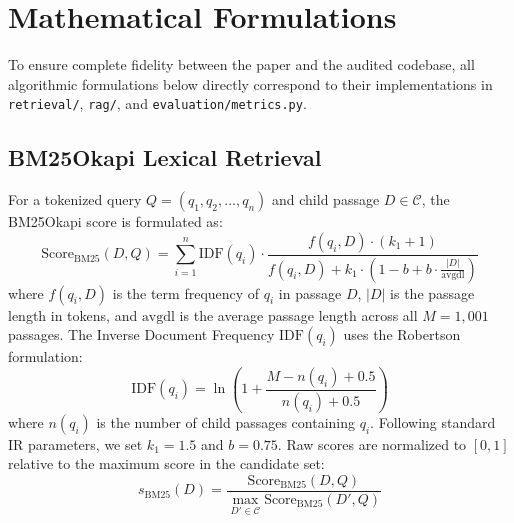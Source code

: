 \documentclass[10pt,twocolumn]{article}
\begin{document}
\section{Mathematical Formulations}
\label{sec:math_formulations}

To ensure complete fidelity between the paper and the audited codebase, all algorithmic formulations below directly correspond to their implementations in \texttt{retrieval/}, \texttt{rag/}, and \texttt{evaluation/metrics.py}.

\subsection{BM25Okapi Lexical Retrieval}
For a tokenized query $Q = (q_1, q_2, \dots, q_n)$ and child passage $D \in \mathcal{C}$, the BM25Okapi score is formulated as:
\begin{equation}
\text{Score}_{\text{BM25}}(D, Q) = \sum_{i=1}^n \text{IDF}(q_i) \cdot \frac{f(q_i, D) \cdot (k_1 + 1)}{f(q_i, D) + k_1 \cdot \left(1 - b + b \cdot \frac{|D|}{\text{avgdl}}\right)}
\label{eq:bm25}
\end{equation}
where $f(q_i, D)$ is the term frequency of $q_i$ in passage $D$, $|D|$ is the passage length in tokens, and $\text{avgdl}$ is the average passage length across all $M = 1,001$ passages. The Inverse Document Frequency $\text{IDF}(q_i)$ uses the Robertson formulation:
\begin{equation}
\text{IDF}(q_i) = \ln \left(1 + \frac{M - n(q_i) + 0.5}{n(q_i) + 0.5}\right)
\label{eq:idf}
\end{equation}
where $n(q_i)$ is the number of child passages containing $q_i$. Following standard IR parameters, we set $k_1 = 1.5$ and $b = 0.75$. Raw scores are normalized to $[0, 1]$ relative to the maximum score in the candidate set:
\begin{equation}
s_{\text{BM25}}(D) = \frac{\text{Score}_{\text{BM25}}(D, Q)}{\max_{D' \in \mathcal{C}} \text{Score}_{\text{BM25}}(D', Q)}
\label{eq:bm25_norm}
\end{equation}
\end{document}
